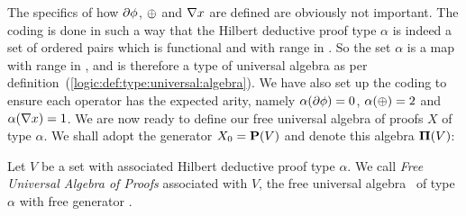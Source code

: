 The specifics of how $\mbox{$\partial$} \phi$, $\mbox{$\oplus$}$ and $\mbox{$\nabla$} x$ are defined
are obviously not important. The coding is done in such a way that
the Hilbert deductive proof type $\alpha$ is indeed a set of ordered
pairs which is functional and with range in \N. So the set $\alpha$
is a map with range in \N, and is therefore a type of universal
algebra as per definition~(\ref{logic:def:type:universal:algebra}).
We have also set up the coding to ensure each operator has the
expected arity, namely $\alpha(\mbox{$\partial$} \phi)=0$, $\alpha(\mbox{$\oplus$})=2$ and
$\alpha(\mbox{$\nabla$} x)=1$. We are now ready to define our free universal
algebra of proofs $X$ of type $\alpha$. We shall adopt the generator
$X_{0}=\mbox{${\bf P}(V)$}$ and denote this algebra $\mbox{${\bf\Pi}(V)$}$: 
\begin{defin}\label{logic:def:FOPL:proof:algebra}
Let $V$ be  a set with associated Hilbert deductive proof type
$\alpha$. We call {\em Free Universal Algebra of Proofs} associated
with $V$, the free universal algebra \pvs\ of type $\alpha$ with
free generator \pv.
\end{defin}

